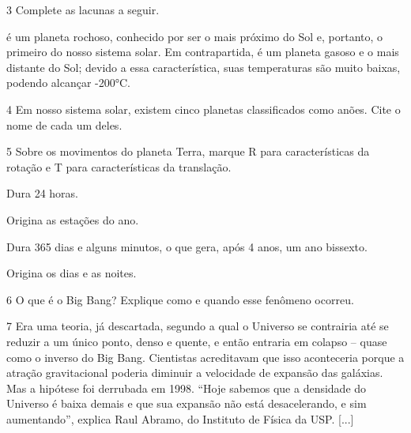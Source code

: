 \num{3}  Complete as lacunas a seguir.

\preencher é um planeta rochoso, conhecido por ser
o mais próximo do Sol e, portanto, o primeiro do nosso sistema solar. Em
contrapartida, \preencher é um planeta gasoso e o mais distante
do Sol; devido a essa característica, suas temperaturas são muito
baixas, podendo alcançar -200°C. 

\num{4}  Em nosso sistema solar, existem cinco planetas classificados como anões. Cite o nome de cada um deles.



\num{5}  Sobre os movimentos do planeta Terra, marque R para características da rotação e T para características da translação.

\begin{boxlist}
\item Dura 24 horas. 

\item Origina as estações do ano. 

\item Dura 365 dias e alguns minutos, o que gera, após 4 anos, um ano
bissexto. 

\item Origina os dias e as noites. 
\end{boxlist}

\num{6}  O que é o Big Bang? Explique como e quando esse fenômeno ocorreu.



\num{7}  Era uma teoria, já descartada, segundo a qual o Universo se contrairia até
  se reduzir a um único ponto, denso e quente, e então entraria em
  colapso -- quase como o inverso do Big Bang. Cientistas acreditavam
  que isso aconteceria porque a atração gravitacional poderia diminuir a
  velocidade de expansão das galáxias. Mas a hipótese foi derrubada em
  1998. ``Hoje sabemos que a densidade do Universo é baixa demais e que
  sua expansão não está desacelerando, e sim aumentando'', explica Raul
  Abramo, do Instituto de Física da USP. [...]


